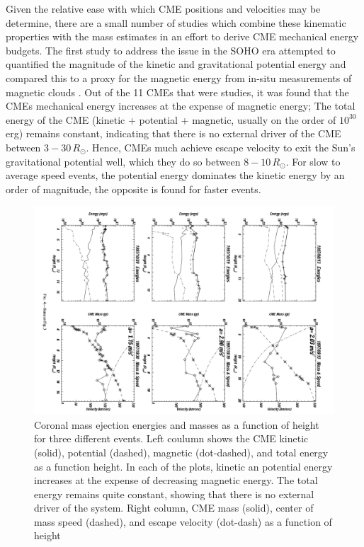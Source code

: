 Given the relative ease with which CME positions and velocities may be determine, there are a small number of studies which combine these kinematic properties with the mass estimates in an effort to derive CME mechanical energy budgets. The first study to address the issue in the SOHO era attempted to quantified the magnitude of the kinetic and gravitational potential energy and compared this to a proxy for the magnetic energy from in-situ measurements of magnetic clouds \citep{vou00}. Out of the 11 CMEs that were studies, it was found that the CMEs mechanical energy increases at the expense of magnetic energy; The total energy of the CME (kinetic + potential + magnetic, usually on the order of $10^{30}$\,erg) remains constant, indicating that there is no external driver of the CME between $3-30\,R_{\odot}$. Hence, CMEs much achieve escape velocity to exit the Sun's gravitational potential well, which they do so between $8-10\,R_{\odot}$. For slow to average speed events, the potential energy dominates the kinetic energy by an order of magnitude, the opposite is found for faster events. 
\begin{figure}[t!]
\begin{center}
\includegraphics[scale=0.4, angle=90, trim=1cm 0cm 2cm 2cm]{images/cme_energies}
\caption[CME energies and masses as a function of height]{Coronal mass ejection energies and masses as a function of height for three different events.
Left coulumn shows the CME kinetic (solid), potential (dashed), magnetic (dot-dashed), and total energy as a function
height. In each of the plots, kinetic an potential energy increases at the expense of decreasing magnetic energy. The total energy 
remains quite constant, showing that there is no external driver of the system. Right column, CME mass (solid), center of mass speed (dashed), and escape velocity (dot-dash) as a function of height \citep{vou00}}
\label{fig:cme_energies}
\end{center} 
\end{figure}


